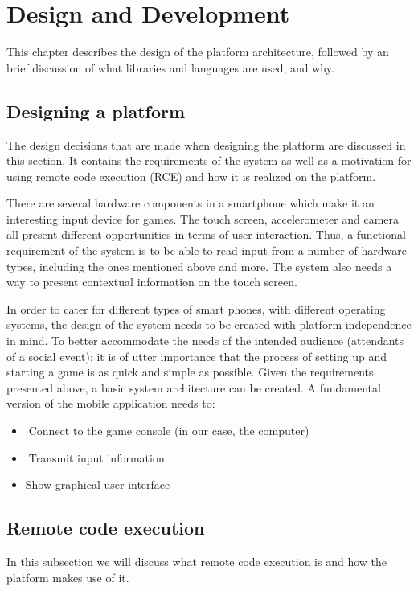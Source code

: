 \documentclass{article}
\begin{document}
\section{Design and Development} 
This chapter describes the design of the platform architecture, followed by an brief discussion
of what libraries and languages are used, and why.

\subsection{Designing a platform}
The design decisions that are made when designing the platform are discussed in this section. It
contains the requirements of the system as well as a motivation for using remote code execution
(RCE) and how it is realized on the platform.

There are several hardware components in a smartphone which make it an interesting input
device for games. The touch screen, accelerometer and camera all present different opportunities
in terms of user interaction. Thus, a functional requirement of the system is to be able to read
input from a number of hardware types, including the ones mentioned above and more. The
system also needs a way to present contextual information on the touch screen.

In order to cater for different types of smart phones, with different operating systems, the design
of the system needs to be created with platform-independence in mind. To better accommodate
the needs of the intended audience (attendants of a social event); it is of utter importance that the
process of setting up and starting a game is as quick and simple as possible.
Given the requirements presented above, a basic system architecture can be created. A
fundamental version of the mobile application needs to:
\begin{itemize}
\itemConnect to the game console (in our case, the computer)
\itemTransmit input information
\item Show graphical user interface
\end{itemize}

\subsection{Remote code execution}
In this subsection we will discuss what remote code execution is and how the platform makes use
of it. 
\end{document}
